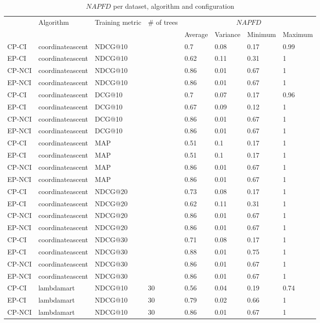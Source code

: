 \begin{landscape}
\begin{longtable}{|*{8}{l|}}
\caption{$NAPFD$ per dataset, algorithm and configuration}
\hline\endhead
\hline\endfoot
\multirow{2}{*}{Dataset}&
\multirow{2}{*}{Algorithm}&
\multirow{2}{*}{Training metric}&
\multirow{2}{*}{\# of trees}&
\multicolumn{4}{c|}{$NAPFD$}\\
&&&& Average & Variance & Minimum & Maximum \\\hline
CP-CI&coordinateascent&NDCG@10&&0.7&0.08&0.17&0.99\\
EP-CI&coordinateascent&NDCG@10&&0.62&0.11&0.31&1\\
CP-NCI&coordinateascent&NDCG@10&&0.86&0.01&0.67&1\\
EP-NCI&coordinateascent&NDCG@10&&0.86&0.01&0.67&1\\
\hline
CP-CI&coordinateascent&DCG@10&&0.7&0.07&0.17&0.96\\
EP-CI&coordinateascent&DCG@10&&0.67&0.09&0.12&1\\
CP-NCI&coordinateascent&DCG@10&&0.86&0.01&0.67&1\\
EP-NCI&coordinateascent&DCG@10&&0.86&0.01&0.67&1\\
\hline
CP-CI&coordinateascent&MAP&&0.51&0.1&0.17&1\\
EP-CI&coordinateascent&MAP&&0.51&0.1&0.17&1\\
CP-NCI&coordinateascent&MAP&&0.86&0.01&0.67&1\\
EP-NCI&coordinateascent&MAP&&0.86&0.01&0.67&1\\
\hline
CP-CI&coordinateascent&NDCG@20&&0.73&0.08&0.17&1\\
EP-CI&coordinateascent&NDCG@20&&0.62&0.11&0.31&1\\
CP-NCI&coordinateascent&NDCG@20&&0.86&0.01&0.67&1\\
EP-NCI&coordinateascent&NDCG@20&&0.86&0.01&0.67&1\\
\hline
CP-CI&coordinateascent&NDCG@30&&0.71&0.08&0.17&1\\
EP-CI&coordinateascent&NDCG@30&&0.88&0.01&0.75&1\\
CP-NCI&coordinateascent&NDCG@30&&0.86&0.01&0.67&1\\
EP-NCI&coordinateascent&NDCG@30&&0.86&0.01&0.67&1\\
\hline
CP-CI&lambdamart&NDCG@10&30&0.56&0.04&0.19&0.74\\
EP-CI&lambdamart&NDCG@10&30&0.79&0.02&0.66&1\\
CP-NCI&lambdamart&NDCG@10&30&0.86&0.01&0.67&1\\

\end{longtable}
\end{landscape}
